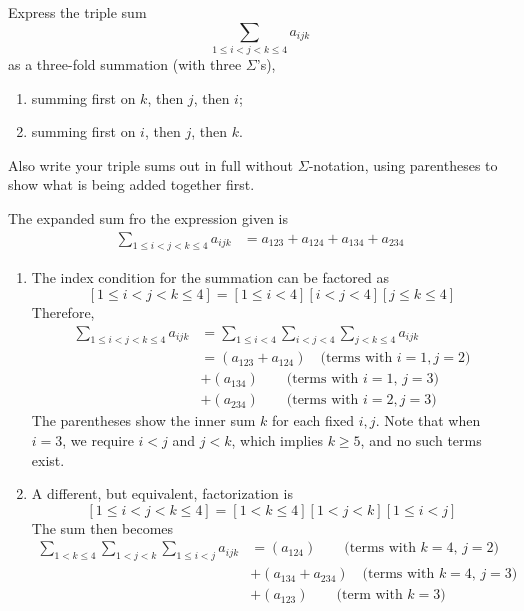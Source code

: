 \documentclass[12pt]{article}
\newenvironment{ex}[2][Exercise]{\begin{trivlist}
		\item[\hskip \labelsep {\bfseries #1}\hskip \labelsep {\bfseries #2.}]}{\end{trivlist}}
\newenvironment{sol}[1][Solution]{\begin{trivlist}
		\item[\hskip \labelsep {\bfseries #1:}]}{\end{trivlist}}
\begin{document}
\begin{ex}{4}
	Express the triple sum
	\[
	\sum_{1\leq i<j<k\leq 4} a_{ijk}
	\]
	as a three-fold summation (with three $\Sigma$'s),
	\begin{enumerate}[label=(\alph*)]
		\item summing first on $k$, then $j$, then $i$;
		\item summing first on $i$, then $j$, then $k$.
	\end{enumerate}
	Also write your triple sums out in full without $\Sigma$-notation, using parentheses to show
	what is being added together first.
\end{ex}

\begin{sol}
	The expanded sum fro the expression given is
	\begin{align*}
		\sum_{1\leq i<j<k\leq 4}a_{ijk}&=a_{123}+a_{124}+a_{134}+a_{234}
	\end{align*}
	\begin{enumerate}[label=(\alph*)]
		\item 	The index condition for the summation can be factored as
		\[
		[1\leq i<j<k\leq 4]=[1\leq i<4][i<j<4][j\leq k\leq 4]
		\]
		Therefore, 
		\begin{align*}
			\sum_{1\leq i<j<k\leq 4} a_{ijk}&=
			\sum_{1\leq i < 4}\sum_{i<j < 4}\sum_{j<k\leq 4}a_{ijk}\\
			&=\left(a_{123}+a_{124}\right)\quad \text{(terms with $i=1, j=2$)}\\
			&+(a_{134})\qquad \text{(terms with $i=1$, $j=3$)}\\
			&+(a_{234}) \qquad\text{(terms with $i=2, j=3$)}
		\end{align*}
		The parentheses show the inner sum $k$ for each fixed $i,j$. Note
		that when $i=3$, we require $i<j$ and $j<k$, which implies $k\geq 5$,
		and no such terms exist.
		\item A different, but equivalent, factorization is
		\[
		[1\leq i<j<k\leq 4]=[1<k\leq 4][1<j<k][1\leq i < j]
		\]
		The sum then becomes
		\begin{align*}
			\sum_{1 < k \leq 4}\sum_{1<j<k}\sum_{1\leq i<j}a_{ijk}
			&=(a_{124})\qquad\text{(terms with $k=4$, $j=2$)}\\
			&+(a_{134}+a_{234})\quad \text{(terms with $k=4$, $j=3$)}\\
			&+(a_{123})\qquad\text{(term with $k=3$)}
		\end{align*}
	\end{enumerate}
\end{sol}
\end{document}
